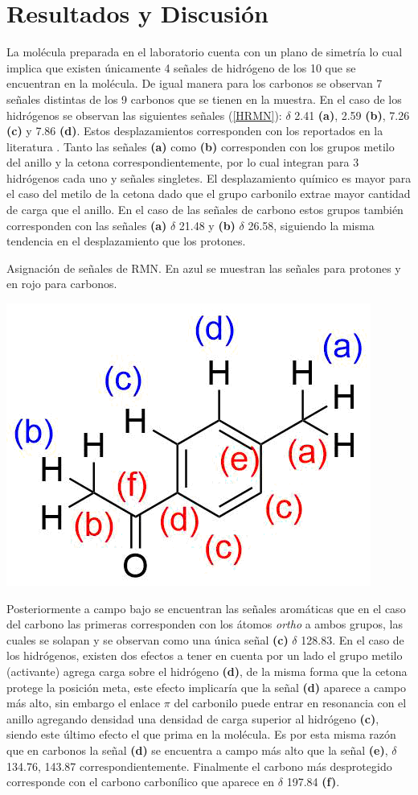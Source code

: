 \documentclass[fleqn,11pt]{SelfArx}
\begin{document}
\section{Resultados y Discusi\'on}
La molécula preparada en el laboratorio cuenta con un plano de simetría lo cual implica que existen únicamente 4 señales de hidrógeno de los 10 que se encuentran en la molécula. De igual manera para los carbonos se observan 7 señales distintas de los 9 carbonos que se tienen en la muestra. En el caso de los hidrógenos se observan las siguientes señales (\autoref{HRMN}): $\delta$ 2.41 \textbf{(a)}, 2.59 \textbf{(b)}, 7.26 \textbf{(c)} y 7.86 \textbf{(d)}. Estos desplazamientos corresponden con los reportados en la literatura \cite{Liu2010}. Tanto las señales \textbf{(a)} como \textbf{(b)} corresponden con los grupos metilo del anillo y la cetona correspondientemente, por lo cual integran para 3 hidrógenos cada uno y señales singletes. El desplazamiento químico es mayor para el caso del metilo de la cetona dado que el grupo carbonilo extrae mayor cantidad de carga que el anillo. En el caso de las señales de carbono estos grupos también corresponden con las señales \textbf{(a)} $\delta$ 21.48 y \textbf{(b)} $\delta$ 26.58, siguiendo la misma tendencia en el desplazamiento que los protones.
\begin{scheme}[h]
	\centering
	\caption{Asignación de señales de RMN. En azul se muestran las señales para protones y en rojo para carbonos.}
	\includegraphics[width=0.45\linewidth]{structures/asignacion.png}
\end{scheme}

Posteriormente a campo bajo se encuentran las señales aromáticas que en el caso del carbono las primeras corresponden con los átomos \textit{ortho} a ambos grupos, las cuales se solapan y se observan como una única señal \textbf{(c)} $\delta$ 128.83. En el caso de los hidrógenos, existen dos efectos a tener en cuenta por un lado el grupo metilo (activante) agrega carga sobre el hidrógeno \textbf{(d)}, de la misma forma que la cetona protege la posición meta, este efecto implicaría que la señal \textbf{(d)} aparece a campo más alto, sin embargo el enlace $\pi$ del carbonilo puede entrar en resonancia con el anillo agregando densidad una densidad de carga superior al hidrógeno \textbf{(c)}, siendo este último efecto el que prima en la molécula. Es por esta misma razón que en carbonos la señal \textbf{(d)} se encuentra a campo más alto que la señal \textbf{(e)}, $\delta$ 134.76, 143.87 correspondientemente. Finalmente el carbono más desprotegido corresponde con el carbono carbonílico que aparece en $\delta$ 197.84 \textbf{(f)}.
\end{document}
